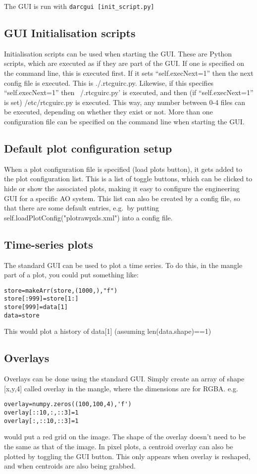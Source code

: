 \documentclass[a4,10pt]{article}
\begin{document}
The GUI is run with {\tt darcgui [init\_script.py]}

\subsection{GUI Initialisation scripts}
Initialisation scripts can be used when starting the GUI.  These are
Python scripts, which are executed as if they are part of the GUI.  If
one is specified on the command line, this is executed first.  If it
sets ``self.execNext=1'' then the next config file is executed.  This
is ./.rtcguirc.py.  Likewise, if this specifies ``self.execNext=1''
then ~/.rtcguirc.py' is executed, and then (if ``self.execNext=1'' is
set) /etc/rtcguirc.py is executed.  This way, any number between 0-4
files can be executed, depending on whether they exist or not.  More
than one configuration file can be specified on the command line when
starting the GUI.

\subsection{Default plot configuration setup}
When a plot configuration file is specified (load plots button), it
gets added to the plot configuration list.  This is a list of toggle
buttons, which can be clicked to hide or show the associated plots,
making it easy to configure the engineering GUI for a specific AO system.
This list can also be created by a config file, so that there are some
default entries, e.g.\ by putting
self.loadPlotConfig("plotrawpxls.xml") into a config file.

\subsection{Time-series plots}
The standard GUI can be used to plot a time series.
To do this, in the mangle part of a plot, you could put something
like:
\begin{verbatim}
store=makeArr(store,(1000,),"f")
store[:999]=store[1:]
store[999]=data[1]
data=store
\end{verbatim}
This would plot a history of data[1] (assuming len(data.shape)==1)

\subsection{Overlays}
Overlays can be done using the standard GUI.
Simply create an array of shape [x,y,4] called overlay in the mangle,
where the dimensions are for RGBA.  
e.g.
\begin{verbatim}
overlay=numpy.zeros((100,100,4),'f')
overlay[::10,:,::3]=1
overlay[:,::10,::3]=1
\end{verbatim}
would put a red grid on the image.  The shape of the overlay doesn't
need to be the same as that of the image.
In pixel plots, a centroid overlay can also be plotted by toggling the
GUI button.  This only appears when overlay is reshaped, and when
centroids are also being grabbed.
\end{document}
